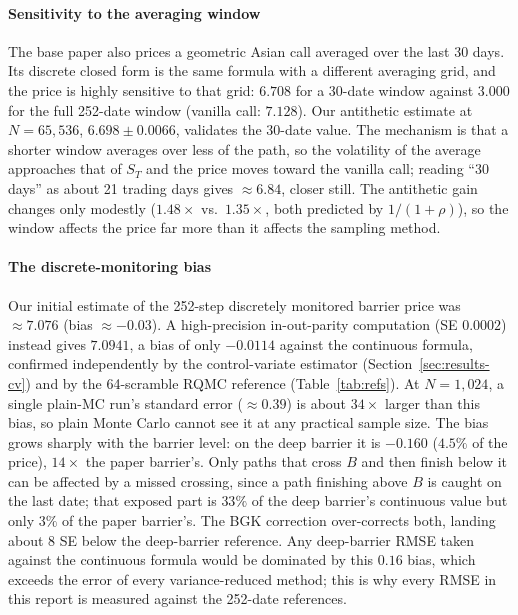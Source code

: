 \documentclass[sigconf]{acmart}
\begin{document}
\paragraph{Sensitivity to the averaging window} The base paper also prices a
geometric Asian call averaged over the last 30 days. Its discrete closed
form is the same formula with a different averaging grid, and the price is
highly sensitive to that grid: $6.708$ for a 30-date window against $3.000$
for the full 252-date window (vanilla call: $7.128$). Our antithetic
estimate at $N=65{,}536$, $6.698\pm0.0066$, validates the 30-date value. The
mechanism is that a shorter window averages over less of the path, so the
volatility of the average approaches that of $S_T$ and the price moves
toward the vanilla call; reading ``30 days'' as about 21 trading days gives
$\approx6.84$, closer still. The antithetic gain changes only modestly
($1.48\times$ vs.\ $1.35\times$, both predicted by $1/(1+\rho)$), so the
window affects the price far more than it affects the sampling method.

\paragraph{The discrete-monitoring bias} Our initial estimate of the 252-step discretely monitored barrier price was $\approx 7.076$ (bias
$\approx -0.03$). A high-precision in-out-parity computation (SE $0.0002$)
instead gives $\mathbf{7.0941}$, a bias of only $\mathbf{-0.0114}$ against
the continuous formula, confirmed independently by the control-variate
estimator (Section~\ref{sec:results-cv}) and by the 64-scramble RQMC
reference (Table~\ref{tab:refs}). At $N=1{,}024$, a single plain-MC run's
standard error ($\approx 0.39$) is about $34\times$ larger than this bias,
so plain Monte Carlo cannot see it at any practical sample size. The bias
grows sharply with the barrier level: on the deep barrier it is $-0.160$
($4.5\%$ of the price), $14\times$ the paper barrier's. Only paths that
cross $B$ and then finish below it can be affected by a missed crossing,
since a path finishing above $B$ is caught on the last date; that exposed
part is $33\%$ of the deep barrier's continuous value but only $3\%$ of the
paper barrier's. The BGK correction over-corrects both, landing about 8 SE
below the deep-barrier reference. Any deep-barrier RMSE taken against the
continuous formula would be dominated by this $0.16$ bias, which exceeds
the error of every variance-reduced method; this is why every RMSE in this
report is measured against the 252-date references.
\end{document}
